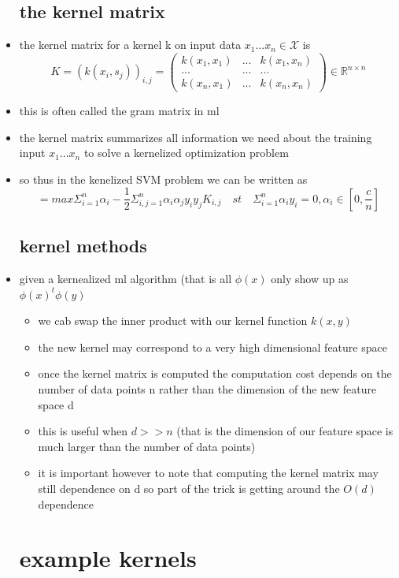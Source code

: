 \documentclass{article}
\begin{document}
\begin{itemize}
\subsection{the kernel matrix}
\item the kernel matrix for a kernel k on input data $x_1...x_n\in \mathcal{X}$ is $$K=(k(x_i,s_j))_{i,j}=\begin{pmatrix}
    k(x_1,x_1)&...&k(x_1,x_n)\\
    ...&...&...\\
    k(x_n,x_1)&...&k(x_n,x_n)
\end{pmatrix} \in \mathbb{R}^{n\times n}$$ 
\item this is often called the gram matrix in ml 
\item the kernel matrix summarizes all information we need about the training input $x_1...x_n$ to solve a kernelized  optimization problem 
\item so thus in the kenelized SVM problem we can be written as $$=max \Sigma_{i=1}^{n}\alpha_{i}-\frac{1}{2}\Sigma_{i,j=1}^{n}\alpha_i\alpha_{j}y_iy_jK_{i,j} \quad st \quad  \Sigma_{i=1}^{n}\alpha_{i}y_{i}=0, \alpha_{i}\in [0,\frac{c}{n}]$$ 
\subsection{kernel methods}
\item given a kernealized ml algorithm (that is all $\phi(x)$ only show up as $\phi(x)^{t}\phi(y)$
\begin{itemize}
    \item we cab swap the inner product with our kernel function $k(x,y)$
    \item the new kernel may correspond to a very high dimensional feature space
    \item once the kernel matrix is computed the computation cost depends on the number of data points n rather than the dimension of the new feature space d
    \item this is useful when $d>>n$ (that is the dimension of our feature space is much larger than the number of data points)
    \item it is important however to note that computing the kernel matrix may still dependence on d so part of the trick is getting around the $O(d)$ dependence 
\end{itemize}
\section{example kernels}

\end{itemize}
\end{document}
